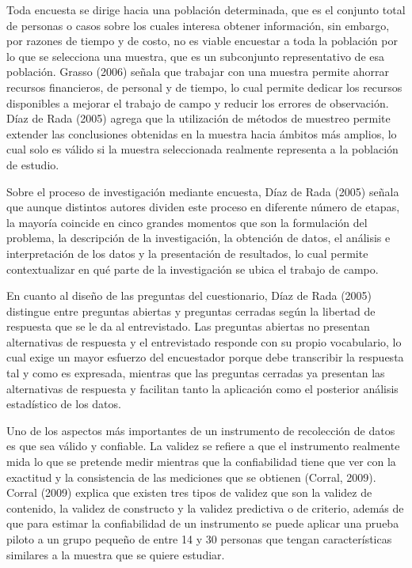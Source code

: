 \documentclass[12pt,letterpaper]{article}
\begin{document}
Toda encuesta se dirige hacia una población determinada, que es el conjunto total de personas o casos sobre los cuales interesa obtener información, sin embargo, por razones de tiempo y de costo, no es viable encuestar a toda la población por lo que se selecciona una muestra, que es un subconjunto representativo de esa población. Grasso (2006) señala que trabajar con una muestra permite ahorrar recursos financieros, de personal y de tiempo, lo cual permite dedicar los recursos disponibles a mejorar el trabajo de campo y reducir los errores de observación. Díaz de Rada (2005) agrega que la utilización de métodos de muestreo permite extender las conclusiones obtenidas en la muestra hacia ámbitos más amplios, lo cual solo es válido si la muestra seleccionada realmente representa a la población de estudio.

Sobre el proceso de investigación mediante encuesta, Díaz de Rada (2005) señala que aunque distintos autores dividen este proceso en diferente número de etapas, la mayoría coincide en cinco grandes momentos que son la formulación del problema, la descripción de la investigación, la obtención de datos, el análisis e interpretación de los datos y la presentación de resultados, lo cual permite contextualizar en qué parte de la investigación se ubica el trabajo de campo.

En cuanto al diseño de las preguntas del cuestionario, Díaz de Rada (2005) distingue entre preguntas abiertas y preguntas cerradas según la libertad de respuesta que se le da al entrevistado. Las preguntas abiertas no presentan alternativas de respuesta y el entrevistado responde con su propio vocabulario, lo cual exige un mayor esfuerzo del encuestador porque debe transcribir la respuesta tal y como es expresada, mientras que las preguntas cerradas ya presentan las alternativas de respuesta y facilitan tanto la aplicación como el posterior análisis estadístico de los datos.

Uno de los aspectos más importantes de un instrumento de recolección de datos es que sea válido y confiable. La validez se refiere a que el instrumento realmente mida lo que se pretende medir mientras que la confiabilidad tiene que ver con la exactitud y la consistencia de las mediciones que se obtienen (Corral, 2009). Corral (2009) explica que existen tres tipos de validez que son la validez de contenido, la validez de constructo y la validez predictiva o de criterio, además de que para estimar la confiabilidad de un instrumento se puede aplicar una prueba piloto a un grupo pequeño de entre 14 y 30 personas que tengan características similares a la muestra que se quiere estudiar.
\end{document}
